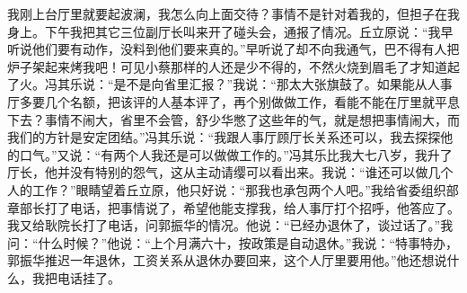 \documentclass[12pt,oneside]{book}
\begin{document}
我刚上台厅里就要起波澜，我怎么向上面交待？事情不是针对着我的，但担子在我身上。下午我把其它三位副厅长叫来开了碰头会，通报了情况。丘立原说：``我早听说他们要有动作，没料到他们要来真的。''早听说了却不向我通气，巴不得有人把炉子架起来烤我吧！可见小蔡那样的人还是少不得的，不然火烧到眉毛了才知道起了火。冯其乐说：``是不是向省里汇报？''我说：``那太大张旗鼓了。如果能从人事厅多要几个名额，把该评的人基本评了，再个别做做工作，看能不能在厅里就平息下去？事情不闹大，省里不会管，舒少华憋了这些年的气，就是想把事情闹大，而我们的方针是安定团结。''冯其乐说：``我跟人事厅顾厅长关系还可以，我去探探他的口气。''又说：``有两个人我还是可以做做工作的。''冯其乐比我大七八岁，我升了厅长，他并没有特别的怨气，这从主动请缨可以看出来。我说：``谁还可以做几个人的工作？''眼睛望着丘立原，他只好说：``那我也承包两个人吧。''我给省委组织部章部长打了电话，把事情说了，希望他能支撑我，给人事厅打个招呼，他答应了。我又给耿院长打了电话，问郭振华的情况。他说：``已经办退休了，谈过话了。''我问：``什么时候？''他说：``上个月满六十，按政策是自动退休。''我说：``特事特办，郭振华推迟一年退休，工资关系从退休办要回来，这个人厅里要用他。''他还想说什么，我把电话挂了。
\end{document}
